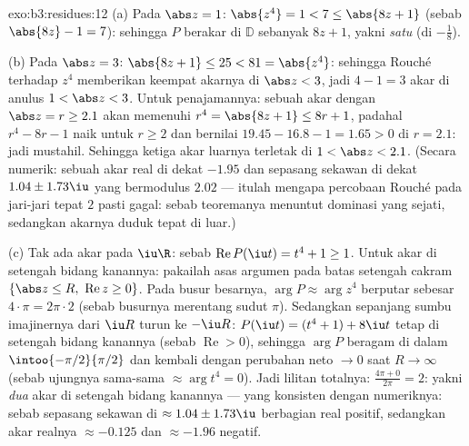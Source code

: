 \begin{solution}{exo:b3:residues:12}
(a) Pada $\abs z = 1$: $\abs{z^4} = 1 < 7 \leq \abs{8z + 1}$
(sebab $\abs{8z} - 1 = 7$): sehingga $P$ berakar di $\mathbb D$ sebanyak
$8z + 1$, yakni \emph{satu} (di $-\frac18$).

(b) Pada $\abs z = 3$: $\abs{8z + 1} \leq 25 < 81 =
\abs{z^4}$: sehingga Rouché terhadap $z^4$ memberikan keempat akarnya di
$\abs z < 3$, jadi $4 - 1 = 3$ akar di anulus $1 <
\abs z < 3$. Untuk penajamannya: sebuah akar dengan $\abs z = r \geq 2.1$
akan memenuhi $r^4 = \abs{8z + 1} \leq 8r + 1$, padahal $r^4 -
8r - 1$ naik untuk $r \geq 2$ dan bernilai $19.45 -
16.8 - 1 = 1.65 > 0$ di $r = 2.1$: jadi mustahil. Sehingga ketiga
akar luarnya terletak di $1 < \abs z < 2.1$. (Secara numerik: sebuah akar
real di dekat $-1.95$ dan sepasang sekawan di dekat $1.04 \pm
1.73\iu$ yang bermodulus $2.02$ --- itulah mengapa percobaan
Rouché pada jari-jari tepat $2$ pasti gagal: sebab teoremanya menuntut
dominasi yang sejati, sedangkan akarnya duduk tepat di luar.)

(c) Tak ada akar pada $\iu\R$: sebab $\operatorname{Re}P(\iu t) = t^4 +
1 \geq 1$. Untuk akar di setengah bidang kanannya: pakailah asas
argumen pada batas setengah cakram $\{\abs z \leq
R,\ \operatorname{Re}z \geq 0\}$. Pada busur besarnya, $\arg P
\approx \arg z^4$ berputar sebesar $4\cdot\pi = 2\pi\cdot2$ (sebab
busurnya merentang sudut $\pi$). Sedangkan sepanjang sumbu imajinernya dari
$\iu R$ turun ke $-\iu R$: $P(\iu t) = (t^4 + 1) + 8\iu t$
tetap di setengah bidang kanannya (sebab $\operatorname{Re} > 0$), sehingga
$\arg P$ beragam di dalam $\intoo{-\pi/2}{\pi/2}$ dan kembali
dengan perubahan neto $\to 0$ saat $R \to \infty$ (sebab ujungnya sama-sama
$\approx \arg t^4 = 0$). Jadi lilitan totalnya: $\frac{4\pi + 0}
{2\pi} = 2$: yakni \emph{dua} akar di setengah bidang kanannya ---
yang konsisten dengan numeriknya: sebab sepasang sekawan di $\approx
1.04 \pm 1.73\iu$ berbagian real positif, sedangkan akar realnya
$\approx -0.125$ dan $\approx -1.96$ negatif.
\end{solution}

